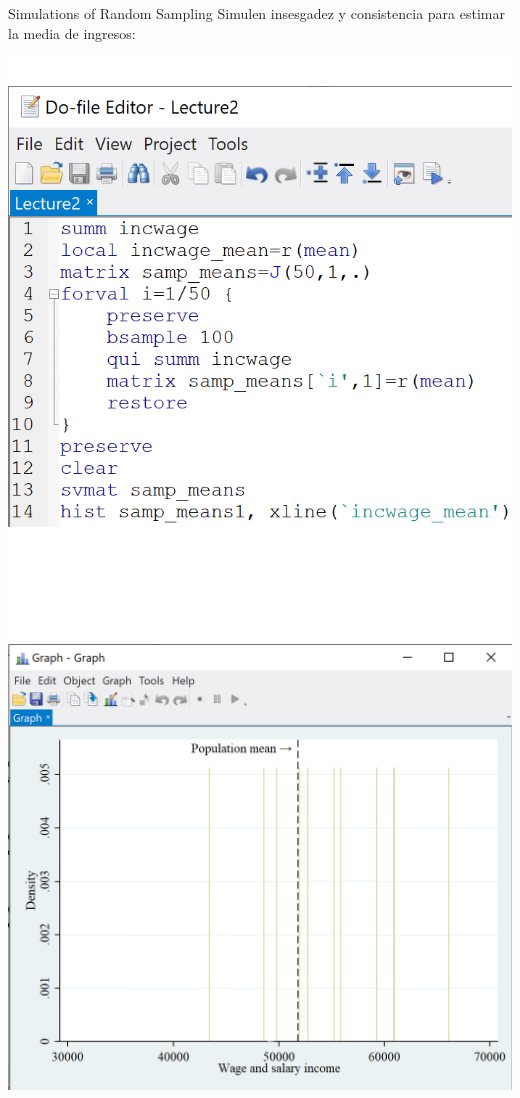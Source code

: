 \documentclass[11pt,handout,aspectratio=169]{beamer}
\begin{document}
\begin{frame}{Simulations of Random Sampling}
\vspace{0.2cm}
Simulen insesgadez  y consistencia para estimar la media de ingresos:

\begin{center}
\includegraphics[scale=0.45]{stata18.png} \includegraphics[scale=0.5]{stata20.png}
\end{center}

\end{frame}
\end{document}

